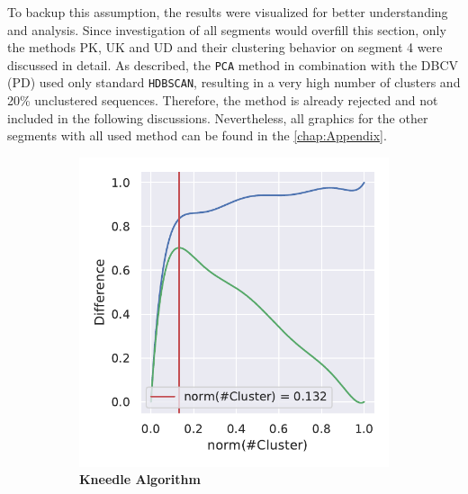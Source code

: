 \vspace{1em}

To backup this assumption, the results were visualized for better understanding and analysis. Since investigation of all segments would overfill this section, only the methods PK, UK and UD and their clustering behavior on segment 4 were discussed in detail. As described, the \texttt{PCA} method in combination with the \gls{DBCV} (PD) used only standard \texttt{HDBSCAN}, resulting in a very high number of clusters and 20\% unclustered sequences. Therefore, the method is already rejected and not included in the following discussions. Nevertheless, all graphics for the other segments with all used method can be found in the \autoref{chap:Appendix}. 

\begin{figure}[!hbt]
    \centering
    \begin{subfigure}[b]{0.475\textwidth}
        \caption[Kneedle Algorithm]{\textbf{Kneedle Algorithm}}
        \label{subfig:PCA_Cluster_Knee_Kneedle_4}            \includegraphics[width=\textwidth]{PCA/Cluster_Knee_Segment_4.pdf}
    \end{subfigure}
    \hfill
    \begin{subfigure}[b]{0.475\textwidth}

\end{subfigure}
\end{figure}
